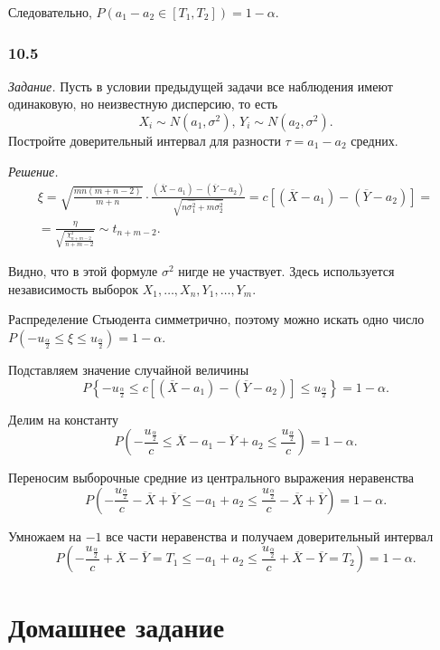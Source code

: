 Следовательно, $P \left( a_1 - a_2 \in \left[ T_1, T_2 \right] \right) = 1 - \alpha $.

\subsubsection*{10.5}

\textit{Задание.}
Пусть в условии предыдущей задачи все наблюдения имеют одинаковую, но неизвестную дисперсию,
то есть
$$X_i \sim N \left( a_1, \sigma^2 \right), \,
  Y_i \sim N \left( a_2, \sigma^2 \right).$$
Постройте доверительный интервал для разности $ \tau = a_1 - a_2$ средних.

\textit{Решение.}
\begin{equation*}
  \begin{split}
    \xi =
    \sqrt{ \frac{mn \left( m + n - 2 \right) }{m + n}} \cdot
    \frac{ \left( \overline{X} - a_1 \right) - \left( \overline{Y} - a_2 \right) }{ \sqrt{n \hat{ \sigma_1^2} + m \hat{ \sigma_2^2}}} =
    c \left[ \left( \overline{X} - a_1 \right) - \left( \overline{Y} - a_2 \right) \right] = \\
    = \frac{ \eta }{ \sqrt{ \frac{ \chi_{n + m - 2}^2}{n + m - 2}}} \sim
    t_{n + m - 2}.
  \end{split}
\end{equation*}

Видно, что в этой формуле $ \sigma^2$ нигде не участвует.
Здесь используется независимость выборок $X_1, \dotsc, X_n, Y_1, \dotsc, Y_m$.

Распределение Стьюдента симметрично,
поэтому можно искать одно число
$P \left( -u_{ \frac{ \alpha }{2}} \leq \xi \leq u_{ \frac{ \alpha }{2}} \right) =
  1 - \alpha $.

Подставляем значение случайной величины
$$P \left\{
    -u_{ \frac{ \alpha }{2}} \leq
    c \left[ \left( \overline{X} - a_1 \right) - \left( \overline{Y} - a_2 \right) \right] \leq
    u_{ \frac{ \alpha }{2}}
  \right\} =
  1 - \alpha.$$

Делим на константу
$$P \left(
    - \frac{u_{ \frac{ \alpha }{2}}}{c} \leq \overline{X} - a_1 - \overline{Y} + a_2 \leq
    \frac{u_{ \frac{ \alpha }{2}}}{c}
  \right) =
  1 - \alpha.$$

Переносим выборочные средние из центрального выражения неравенства
$$P \left(
    - \frac{u_{ \frac{ \alpha }{2}}}{c} - \overline{X} + \overline{Y} \leq - a_1 + a_2 \leq
    \frac{u_{ \frac{ \alpha }{2}}}{c} - \overline{X} + \overline{Y}
  \right) =
  1 - \alpha.$$

Умножаем на $-1$ все части неравенства и получаем доверительный интервал
$$P \left(
    - \frac{u_{ \frac{ \alpha }{2}}}{c} + \overline{X} - \overline{Y} = T_1 \leq - a_1 + a_2 \leq
    \frac{u_{ \frac{ \alpha }{2}}}{c} + \overline{X} - \overline{Y} = T_2
  \right) =
  1 - \alpha.$$

\section*{Домашнее задание}
